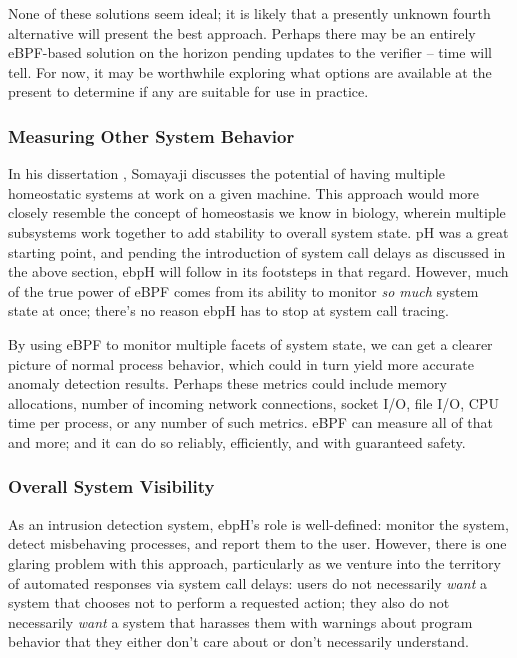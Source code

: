 \documentclass[
  12pt]{findlay}
\begin{document}
None of these solutions seem ideal; it is likely that a presently
unknown fourth alternative will present the best approach. Perhaps there
may be an entirely eBPF-based solution on the horizon pending updates to
the verifier -- time will tell. For now, it may be worthwhile exploring
what options are available at the present to determine if any are
suitable for use in practice.

\hypertarget{measuring-other-system-behavior}{%
\subsubsection{Measuring Other System
Behavior}\label{measuring-other-system-behavior}}

In his dissertation \autocite{soma02}, Somayaji discusses the potential
of having multiple homeostatic systems at work on a given machine. This
approach would more closely resemble the concept of homeostasis we know
in biology, wherein multiple subsystems work together to add stability
to overall system state. pH was a great starting point, and pending the
introduction of system call delays as discussed in the above section,
ebpH will follow in its footsteps in that regard. However, much of the
true power of eBPF comes from its ability to monitor \emph{so much}
system state at once; there's no reason ebpH has to stop at system call
tracing.

By using eBPF to monitor multiple facets of system state, we can get a
clearer picture of normal process behavior, which could in turn yield
more accurate anomaly detection results. Perhaps these metrics could
include memory allocations, number of incoming network connections,
socket I/O, file I/O, CPU time per process, or any number of such
metrics. eBPF can measure all of that and more; and it can do so
reliably, efficiently, and with guaranteed safety.

\hypertarget{overall-system-visibility}{%
\subsubsection{Overall System
Visibility}\label{overall-system-visibility}}

As an intrusion detection system, ebpH's role is well-defined: monitor
the system, detect misbehaving processes, and report them to the user.
However, there is one glaring problem with this approach, particularly
as we venture into the territory of automated responses via system call
delays: users do not necessarily \emph{want} a system that chooses not
to perform a requested action; they also do not necessarily \emph{want}
a system that harasses them with warnings about program behavior that
they either don't care about or don't necessarily understand.
\end{document}
